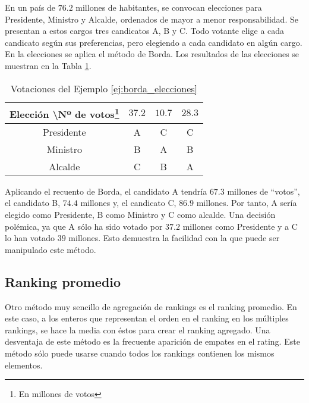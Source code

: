 \begin{ejemplo}\label{ej:borda_elecciones} 

En un país de $76.2$ millones de habitantes, se convocan elecciones para Presidente, Ministro y Alcalde, ordenados de mayor a menor responsabilidad. Se presentan a estos cargos tres candicatos A, B y C. Todo votante elige a cada candicato según sus preferencias, pero elegiendo a cada candidato en algún cargo. En la elecciones se aplica el método de Borda. Los resultados de las elecciones se muestran en la Tabla \ref{tbl:borda_elecciones}.\\
 
\begin{savenotes}
\begin{table}[h]
\centering
\caption{Votaciones del Ejemplo \ref{ej:borda_elecciones}}
\label{tbl:borda_elecciones}
\begin{tabular}{@{}cccc@{}}
\toprule
Elección \textbackslash Nº de votos\footnote{En millones de votos} & $37.2$ & $10.7$ & $28.3$ \\ \midrule
Presidente           & A    & C    & C    \\
Ministro             & B    & A    & B    \\
Alcalde              & C    & B    & A    \\ \bottomrule
\end{tabular}
\end{table}
\end{savenotes}

Aplicando el recuento de Borda, el candidato A tendría $67.3$ millones de ``votos'', el candidato B, $74.4$ millones y, el candicato C, $86.9$ millones. Por tanto, A sería elegido como Presidente, B como Ministro y C como alcalde. Una decisión polémica, ya que A sólo ha sido votado por $37.2$ millones como Presidente y a C lo han votado $39$ millones. Esto demuestra la facilidad con la que puede ser manipulado este método.  

\end{ejemplo}

\subsection{Ranking promedio}
Otro método muy sencillo de agregación de rankings es el ranking promedio. En este caso, a los enteros que representan el orden en el ranking en los múltiples rankings, se hace la media con éstos para crear el ranking agregado. Una desventaja de este método es la frecuente aparición de empates en el rating. Este método sólo puede usarse cuando todos los rankings contienen los mismos elementos. 

